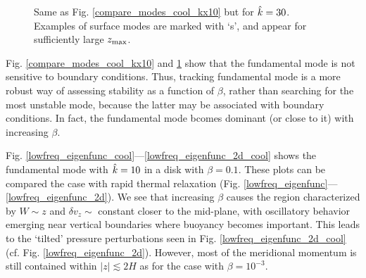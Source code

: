\begin{figure}
  \caption{Same as Fig. \ref{compare_modes_cool_kx10} but for
    $\hat{k}=30$. Examples of surface modes are marked with `s', and 
    appear for sufficiently large $z_\mathrm{max}$.
    \label{compare_modes_cool_kx30} 
  }
\end{figure}

Fig. \ref{compare_modes_cool_kx10} and \ref{compare_modes_cool_kx30} 
show that the fundamental mode is not sensitive to boundary
conditions. Thus, tracking fundamental mode is a
more robust way of assessing stability as a function of $\beta$,
rather than searching for the most 
unstable mode, because the latter may be associated with boundary
conditions. In fact, the fundamental mode bcomes dominant 
(or close to it) with increasing $\beta$. 

Fig. \ref{lowfreq_eigenfunc_cool}---\ref{lowfreq_eigenfunc_2d_cool}
shows the fundamental mode with $\hat{k}=10$ in a disk with 
$\beta=0.1$. These plots can be compared the case with rapid thermal
relaxation (Fig. \ref{lowfreq_eigenfunc}---\ref{lowfreq_eigenfunc_2d}). We see 
that increasing $\beta$ causes the region characterized by $W\sim z$ and  
$\delta v_z\sim$ constant closer to the mid-plane, with oscillatory
behavior emerging near vertical boundaries where buoyancy becomes
important. This leads to the `tilted' pressure perturbations seen in
Fig. \ref{lowfreq_eigenfunc_2d_cool}
(cf. Fig. \ref{lowfreq_eigenfunc_2d}). However, most of the meridional
momentum is still contained within $|z|\lesssim 2H$ as for 
the case with $\beta=10^{-3}$.  

